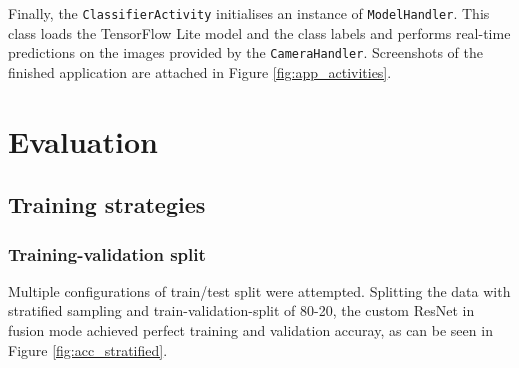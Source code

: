 \documentclass{l4proj}
\begin{document}
Finally, the \lstinline{ClassifierActivity} initialises an instance of \lstinline{ModelHandler}. This class loads the TensorFlow Lite model and the class labels and performs real-time predictions on the images provided by the \lstinline{CameraHandler}. Screenshots of the finished application are attached in Figure \ref{fig:app_activities}.




\chapter{Evaluation}
\label{evaluation}

\section{Training strategies}

\subsection{Training-validation split}
\label{eval_train_val_split}

Multiple configurations of train/test split were attempted. Splitting the data with stratified sampling and train-validation-split of 80-20, the custom ResNet in fusion mode achieved perfect training and validation accuray, as can be seen in Figure \ref{fig:acc_stratified}.  
\end{document}
